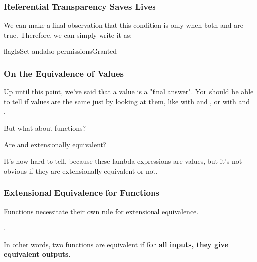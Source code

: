 \documentclass[aspectratio=169]{beamer}
\begin{document}
\begin{frame}[fragile]
  \frametitle{Referential Transparency Saves Lives}

  We can make a final observation that this condition is only
   when both  and 
  are true. Therefore, we can simply write it as:

  \pause
  \vspace{\fill}

  \begin{codeblock}
    flagIsSet andalso permissionsGranted
  \end{codeblock}

  \pause
  \vspace{\fill}


\end{frame}

\begin{frame}[fragile]
  \frametitle{On the Equivalence of Values}

  Up until this point, we've said that a value is a "final answer". You should be able
  to tell if values are the same just by looking at them, like with  and ,
  or with  and .

  \vspace{\fill}

  But what about functions?

  \pause
  \vspace{5pt}

  Are  and  extensionally equivalent?

  \pause
  \vspace{\fill}

  It's now hard to tell, because these lambda expressions are values, but it's not obvious
  if they are extensionally equivalent or not.
\end{frame}

\begin{frame}[fragile]
  \frametitle{Extensional Equivalence for Functions}

  Functions necessitate their own rule for extensional equivalence.

  \pause
  \vspace{\fill}

  .

  \pause
  \vspace{5pt}

  In other words, two functions are equivalent if \textbf{for all inputs, they give equivalent outputs}.

  \pause
  \vspace{\fill}

\end{frame}
\end{document}
